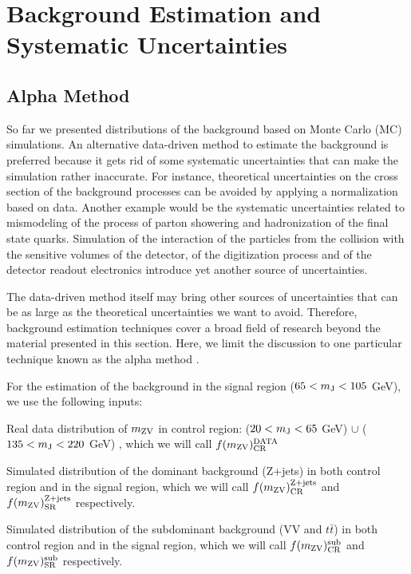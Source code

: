 \chapter{Background Estimation and Systematic Uncertainties}
\label{bkgEstimation}
\section{Alpha Method}
So far we presented distributions of the background based on Monte Carlo (MC) simulations. An alternative data-driven method to estimate the background is preferred because it gets rid of some systematic uncertainties that can make the simulation rather inaccurate. For instance, theoretical uncertainties on the cross section of the background processes can be avoided by applying a normalization based on data. Another example would be the systematic uncertainties related to mismodeling of the process of parton showering and hadronization of the final state quarks. Simulation of the interaction of the particles from the collision with the sensitive volumes of the detector, of the digitization process and of the detector readout electronics introduce yet another source of uncertainties. 

The data-driven method itself may bring other sources of uncertainties that can be as large as the theoretical uncertainties we want to avoid. Therefore, background estimation techniques cover a broad field of research beyond the material presented in this section. Here, we limit the discussion to one particular technique known as the alpha method \cite{Mozer:2016wzi}.  

For the estimation of the background in the signal region ($65 < m_\mathrm{J} < 105$ GeV), we use the following inputs:
\begin{compact_itemize}
\item Real data distribution of $m_\mathrm{ZV}$ in control region: ($20 < m_\mathrm{J} < 65$ GeV)  $\cup$ ($135 < m_\mathrm{J} <220$ GeV) , which we will call $f(m_\mathrm{ZV})^{\textrm{DATA}}_{\textrm{CR}}$
\item Simulated distribution of the dominant background (Z+jets) in  both control region and in the signal region, which we will call $f(m_\mathrm{ZV})^{\textrm{Z+jets}}_{\textrm{CR}}$ and $f(m_\mathrm{ZV})^{\textrm{Z+jets}}_{\textrm{SR}}$ respectively.
\item Simulated distribution of the subdominant background (VV and $t\bar{t}$) in  both control region and in the signal region, which we will call $f(m_\mathrm{ZV})^{\textrm{sub}}_{\textrm{CR}}$ and $f(m_\mathrm{ZV})^{\textrm{sub}}_{\textrm{SR}}$ respectively.
\end{compact_itemize}

